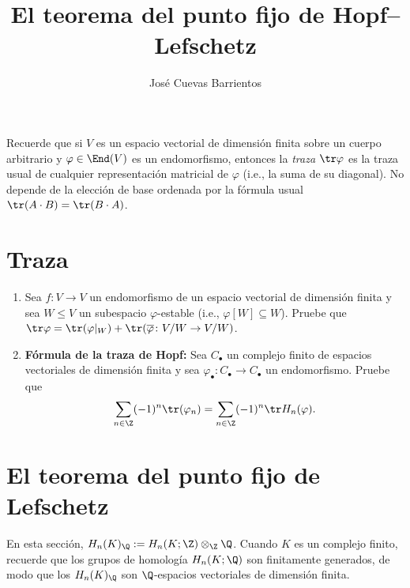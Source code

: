 \documentclass[11pt, reqno]{amsart}
\title{El teorema del punto fijo de Hopf--Lefschetz}
\date{\DTMdate{2026-09-24}}
\author{José Cuevas Barrientos}
\begin{document}
\maketitle

Recuerde que si $V$ es un espacio vectorial de dimensión finita sobre un cuerpo arbitrario y $\varphi \in \End(V)$ es un endomorfismo,
entonces la \emph{traza} $\tr\varphi$ es la traza usual de cualquier representación matricial de $\varphi$ (i.e., la suma de su diagonal).
No depende de la elección de base ordenada por la fórmula usual $\tr(A\cdot B) = \tr(B\cdot A)$.

\section{Traza}
\begin{enumerate}
	\item Sea $f \colon V \to V$ un endomorfismo de un espacio vectorial de dimensión finita y sea $W \le V$ un subespacio
		$\varphi$-estable (i.e., $\varphi[W] \subseteq W$).
		Pruebe que $\tr\varphi = \tr(\varphi|_W) + \tr(\overline{\varphi} \colon V/W \to V/W)$.

	\item \textbf{Fórmula de la traza de Hopf:}
		Sea $C_\bullet$ un complejo finito de espacios vectoriales de dimensión finita y sea $\varphi_\bullet \colon C_\bullet \to
		C_\bullet$ un endomorfismo.
		Pruebe que
		\[
			\sum_{n\in\Z} (-1)^n \tr(\varphi_n) = \sum_{n\in\Z} (-1)^n \tr H_n(\varphi).
		\]
\end{enumerate}

\section{El teorema del punto fijo de Lefschetz}
En esta sección, $H_n(K)_\Q := H_n(K; \Z) \otimes_\Z \Q$.
Cuando $K$ es un complejo finito, recuerde que los grupos de homología $H_n(K; \Q)$ son finitamente generados, de modo que los $H_n(K)_\Q$
son $\Q$-espacios vectoriales de dimensión finita.
\end{document}
